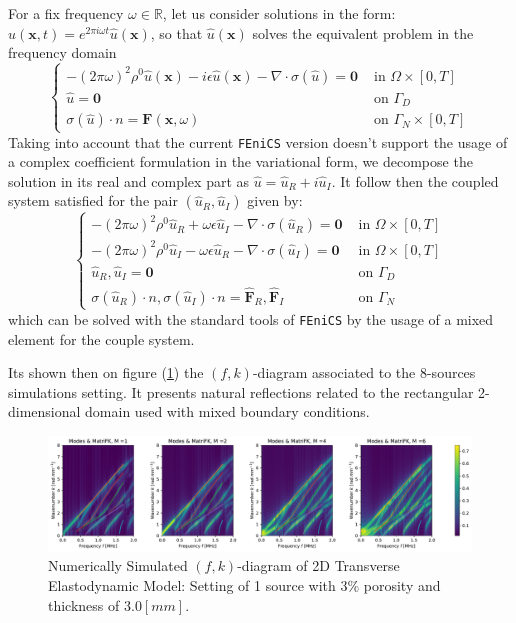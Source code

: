 For a fix frequency $\omega \in \mathbb{R}$, let us consider solutions in the form: $u(\mathbf{x},t) = e^{2 \pi i \omega t}\hat{u}(\mathbf{x})$, so that $\hat{u}(\mathbf{x})$ solves the equivalent problem in the frequency domain
\begin{equation*}
    \left \{
    \begin{array}{ccc}
        -(2\pi \omega)^2 \rho^0 \hat{u}(\mathbf{x}) - i \epsilon \hat{u}(\mathbf{x}) - \nabla \cdot \sigma(\hat{u}) = \mathbf{0} & \text{ in } \Omega \times [0,T] \\
        \hat{u} = \mathbf{0} & \text{ on } \Gamma_D\\
        \sigma(\hat{u}) \cdot n = \mathbf{F}(\mathbf{x}, \omega) & \text{ on }\Gamma_N \times [0,T]
    \end{array}
    \right .
\end{equation*}
Taking into account that the current \texttt{FEniCS} version doesn't support the usage of a complex coefficient formulation in the variational form, we decompose the solution in its real and complex part as $\hat{u} = \hat{u}_R + i \hat{u}_I$. It follow then the coupled system satisfied for the pair $(\hat{u}_R, \hat{u}_I)$ given by:
\begin{equation*}
    \left \{
    \begin{array}{cc}
        -(2\pi \omega)^2 \rho^0 \hat{u}_R +  \omega \epsilon \hat{u}_I - \nabla \cdot \sigma (\hat{u}_R) = \mathbf{0} & \text{ in }\Omega \times [0,T] \\
        -(2\pi \omega)^2 \rho^0 \hat{u}_I - \omega \epsilon \hat{u}_R - \nabla \cdot \sigma (\hat{u}_I) = \mathbf{0} & \text{ in }\Omega \times [0, T] \\
        \hat{u}_R, \hat{u}_I = \mathbf{0} & \text{ on } \Gamma_D \\
        \sigma(\hat{u}_R)\cdot n, \sigma(\hat{u}_I)\cdot n = \hat{\mathbf{F}}_R, \hat{\mathbf{F}}_I & \text{ on }\Gamma_N
    \end{array}
    \right.
\end{equation*}
which can be solved with the standard tools of \texttt{FEniCS} by the usage of a mixed element for the couple system.

Its shown then on figure (\ref{FK-DiagramFreqS8P12M28}) the $(f,k)$-diagram associated to the 8-sources simulations setting. It presents natural reflections related to the rectangular 2-dimensional domain used with mixed boundary conditions.
\begin{figure}[!h]
	\centering
	\includegraphics[width=\textwidth]{images/FreqMultSous/2DMixedP12TransIsoFKW28M400_y.pdf}
	\caption{Numerically Simulated $(f,k)$-diagram of 2D Transverse Elastodynamic Model: Setting of 1 source with $3\%$ porosity and thickness of $3.0 [mm]$.}
	\label{FK-DiagramFreqS8P12M28}
\end{figure}

